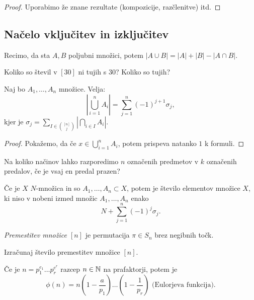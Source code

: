 \begin{proof}
    Uporabimo že znane rezultate (kompozicije, razčlenitve) itd.
\end{proof}

\subsection{Načelo vključitev in izključitev}
Recimo, da sta $A, B$ poljubni množici, potem $|A \cup B| = |A| + |B| - |A \cap B|$.
\begin{primer}
    Koliko so števil v $[30]$ ni tujih s $30$? Koliko so tujih?
\end{primer}

\begin{izrek}
    Naj bo $A_1, \ldots, A_n$ množice. Velja: 
    $$\left| \bigcup_{i=1}^n A_i \right| = \sum_{j=1}^{n}(-1)^{j+1}\sigma_j,$$
    kjer je $\displaystyle \sigma_j = \sum_{I \in \binom{[n]}{j}} \left|\bigcap_{i \in I} A_i\right|$.
\end{izrek}

\begin{proof}
    Pokažemo, da če $x \in \bigcup_{i=1}^n A_i$, potem prispeva natanko $1$ k formuli.
\end{proof}

\begin{primer}
    Na koliko načinov lahko razporedimo $n$ označenih predmetov v $k$ označenih predalov, če je vsaj en predal prazen?
\end{primer}

\begin{posledica}
    Če je $X$ $N$-množica in so $A_1, \ldots, A_n \subset X$, potem je število elementov množice $X$, ki niso v nobeni izmed množic $A_1, \ldots, A_n$ enako 
    $$N + \sum_{j=1}^{n}(-1)^j \sigma_j.$$
\end{posledica}

\begin{definicija}
    \emph{Premestitev množice $[n]$} je permutacija $\pi \in S_n$ brez negibnih točk.
\end{definicija}

\begin{primer}
    Izračunaj število premestitev množice $[n]$.
\end{primer}

\begin{izrek}
    Če je $n = p_1^{e_1} \ldots p_r^{e^r}$ razcep $n \in \mathbb{N}$ na prafaktorji, potem je 
    $$\phi(n) = n(1 - \frac{a}{p_1}) \ldots (1 - \frac{1}{p_r}) \text{ (Eulorjeva funkcija)}.$$
\end{izrek}

